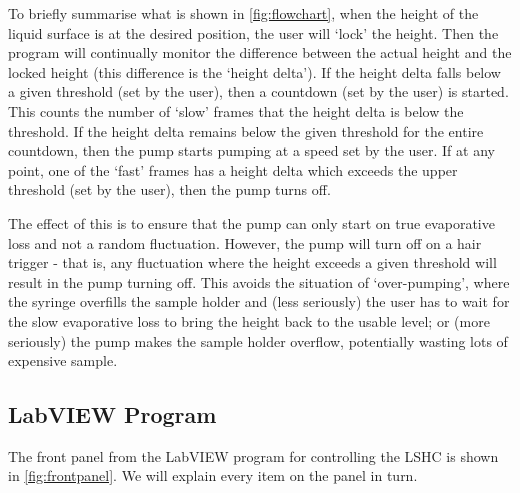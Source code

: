 \documentclass[11pt,a4paper,twoside]{article}
\begin{document}
To briefly summarise what is shown in \autoref{fig:flowchart}, when the height of the liquid surface is at the desired position, the user will `lock' the height. Then the program will continually monitor the difference between the actual height and the locked height (this difference is the `height delta'). If the height delta falls below a given threshold (set by the user), then a countdown (set by the user) is started. This counts the number of `slow' frames that the height delta is below the threshold. If the height delta remains below the given threshold for the entire countdown, then the pump starts pumping at a speed set by the user. If at any point, one of the `fast' frames has a height delta which exceeds the upper threshold (set by the user), then the pump turns off. 

The effect of this is to ensure that the pump can only start on true evaporative loss and not a random fluctuation. However, the pump will turn off on a hair trigger - that is, any fluctuation where the height exceeds a given threshold will result in the pump turning off. This avoids the situation of `over-pumping', where the syringe overfills the sample holder and (less seriously) the user has to wait for the slow evaporative loss to bring the height back to the usable level; or (more seriously) the pump makes the sample holder overflow, potentially wasting lots of expensive sample. 

\subsection{LabVIEW Program}
The front panel from the LabVIEW program for controlling the LSHC is shown in \autoref{fig:frontpanel}. We will explain every item on the panel in turn. 
\end{document}
